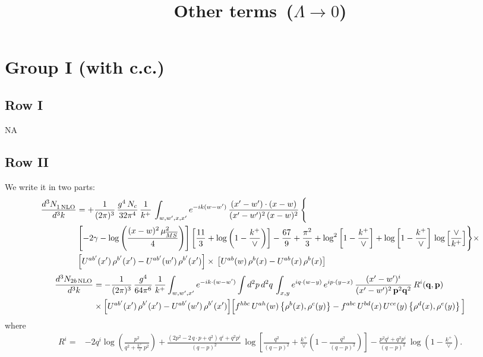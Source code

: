 \documentclass[9pt]{article}
\title{Other terms\, ($\Lambda\to 0$)}
\author{}
\date{}
\numberwithin{equation}{section}
\begin{document}
\maketitle
\section{Group I (with c.c.)}
\subsection{Row I}
\textsc{NA}
\subsection{Row II}
We write it in two parts:
\begin{align}
     \frac{d^{3}N_{1\,\rm NLO}^{\rm}}{d^{3}k} &  =  +\frac{1}{(2\pi)^{3}}\, \frac{g^{4}\,N_{c}}{32\pi^{4}}\,\frac{1}{k^{+}}\, \int_{w, w',x,x'} e^{-ik(w-w^\prime)}\, \frac{(x'-w')\cdot (x-w)}{(x'-w')^{2}\, (x-w)^{2}}\, \Bigg\{ \notag \\ & \left[-2\gamma-\log{\left(\frac{(x-w)^{2}\,\mu^{2}_{\overline{MS}}}{4}\right)}\right]\left[\frac{11}{3}+\log{\left(1-\frac{k^{+}}{\vee}\right)}\right]-\frac{67}{9}+\frac{\pi^{2}}{3}+\log^{2}{\left[1-\frac{k^{+}}{\vee}\right]}+\log{\left[1-\frac{k^{+}}{\vee}\right]}\,\log{\left[\frac{\vee}{k^{+}}\right]}\Bigg\}\times\notag \\ & \left[U^{ab'}(x')\,\rho^{b'}(x') - U^{ab'}(w')\,\rho^{b'}(x')\right]\times\,\left[U^{ab}(w)\,\rho^{b}(x) - U^{ab}(x)\,\rho^{b}(x)\right]
\end{align}
\begin{align}
\frac{d^{3}N_{2b\,\rm NLO}}{d^{3}k} & = -\frac{1}{(2\pi)^{3}}\,\frac{g^{4}}{64\pi^{6}}\,\frac{1}{k^{+}}\int_{w,w',x'} e^{-ik\cdot(w-w')}
\int d^{2}p\,d^{2}q\,\int_{x,y} e^{iq\cdot(w-y)}\,e^{ip\cdot(y-x)}\,\frac{(x'-w')^{i}}{(x'-w')^{2}\,\mathbf{p}^{2}\mathbf{q}^{2}}\,R^{i}(\mathbf{q},\mathbf{p})\notag\\
&\times\Big[U^{ab'}(x')\,\rho^{b'}(x')-U^{ab'}(w')\,\rho^{b'}(x')\Big]
\Big[f^{hbc}\,U^{ah}(w)\left\{\rho^{b}(x),\rho^{c}(y)\right\}-f^{abc}\,U^{bd}(x)\,U^{ce}(y)\left\{\rho^{d}(x),\rho^{e}(y)\right\}\Big]
\end{align}
where
\begin{align}
R^{i} =& -2q^{i}\log\left(\frac{p^{2}}{q^{2}+\frac{k^{+}}{\vee}\,p^{2}}\right)
+\frac{(2p^{2}-2\,q\cdot p+q^{2})\,q^{i}+q^{2}p^{i}}{(q-p)^{2}}\,
\log\left[\frac{q^{2}}{(q-p)^{2}}+\frac{k^{+}}{\vee}\left(1-\frac{q^{2}}{(q-p)^{2}}\right)\right]
-\frac{p^{2}q^{i}+q^{2}p^{i}}{(q-p)^{2}}\,\log\left(1-\frac{k^{+}}{\vee}\right).
\end{align}
\end{document}

